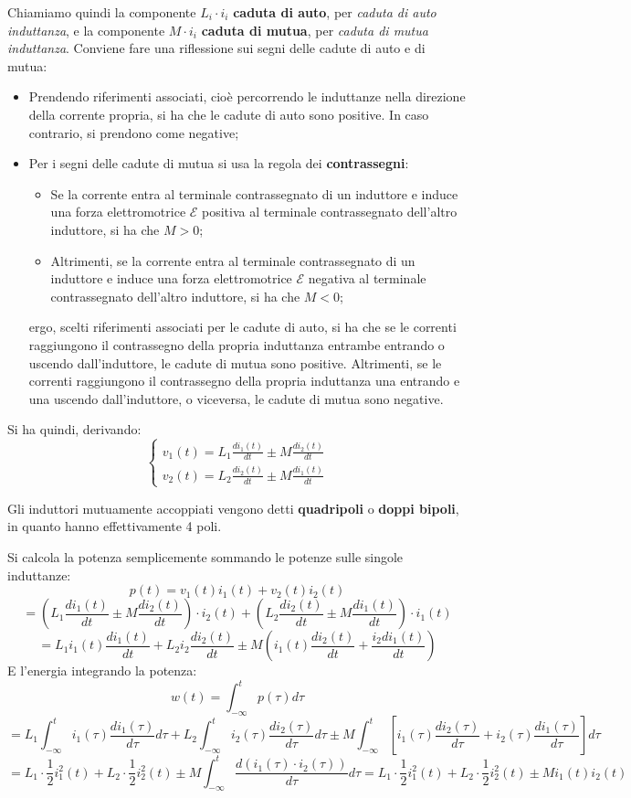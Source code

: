 \documentclass[a4paper,11pt]{article}
\begin{document}
Chiamiamo quindi la componente $L_i \cdot i_i$ \textbf{caduta di auto}, per \textit{caduta di auto induttanza}, e la componente $M \cdot i_i$ \textbf{caduta di mutua}, per \textit{caduta di mutua induttanza}.
Conviene fare una riflessione sui segni delle cadute di auto e di mutua: 
\begin{itemize}
	\item Prendendo riferimenti associati, cioè percorrendo le induttanze nella direzione della corrente propria, si ha che le cadute di auto sono positive. In caso contrario, si prendono come negative;
	\item Per i segni delle cadute di mutua si usa la regola dei \textbf{contrassegni}:
		\begin{itemize}
			\item Se la corrente entra al terminale contrassegnato di un induttore e induce una forza elettromotrice $\mathcal{E}$ positiva al terminale contrassegnato dell'altro induttore, si ha che $M>0$;
			\item Altrimenti, se la corrente entra al terminale contrassegnato di un induttore e induce una forza elettromotrice $\mathcal{E}$ negativa al terminale contrassegnato dell'altro induttore, si ha che $M<0$;
		\end{itemize}
	ergo, scelti riferimenti associati per le cadute di auto, si ha che se le correnti raggiungono il contrassegno della propria induttanza entrambe entrando o uscendo dall'induttore, le cadute di mutua sono positive.
	Altrimenti, se le correnti raggiungono il contrassegno della propria induttanza una entrando e una uscendo dall'induttore, o viceversa, le cadute di mutua sono negative.
\end{itemize}

Si ha quindi, derivando:
\[
	\begin{cases}
		v_1(t) = L_1 \frac{d i_1(t)}{dt} \pm M \frac{d i_2(t)}{dt} \\ 
		v_2(t) = L_2 \frac{d i_2(t)}{dt} \pm M \frac{d i_1(t)}{dt}
	\end{cases}
\]

Gli induttori mutuamente accoppiati vengono detti \textbf{quadripoli} o \textbf{doppi bipoli}, in quanto hanno effettivamente 4 poli.

Si calcola la potenza semplicemente sommando le potenze sulle singole induttanze:
$$
p(t) = v_1(t)i_1(t) + v_2(t)i_2(t)  
$$
$$
= \left( L_1 \frac{d i_1(t)}{dt} \pm M \frac{d i_2 (t)}{dt} \right) \cdot i_2(t) +  \left( L_2 \frac{d i_2(t)}{dt} \pm M \frac{d i_1 (t)}{dt} \right) \cdot i_1(t)
$$
$$
= L_1 i_1(t) \frac{d i_1(t)}{dt} + L_2 i_2 \frac{d i_2(t)}{dt} \pm M \left( i_1(t) \frac{d i_2(t)}{dt} + \frac{i_2 d i_1(t)}{dt} \right)
$$
E l'energia integrando la potenza:
$$
w(t) = \int_{-\infty}^t p(\tau) d\tau 
$$
$$
= L_1 \int_{-\infty}^t i_1(\tau) \frac{d i_1 (\tau)}{d\tau}d\tau + L_2 \int_{-\infty}^t i_2(\tau) \frac{d i_2 (\tau)}{d\tau}d\tau \pm M \int_{-\infty}^t \left[ i_1(\tau) \frac{d i_2(\tau)}{d \tau} + i_2(\tau) \frac{d i_1(\tau)}{d \tau} \right] d\tau
$$
$$
= L_1 \cdot \frac{1}{2} i_1^2(t) + L_2 \cdot \frac{1}{2} i_2^2(t) \pm M \int_{-\infty}^t \frac{d(i_1(\tau) \cdot i_2(\tau))}{d\tau}d\tau = L_1 \cdot \frac{1}{2} i_1^2(t) + L_2 \cdot \frac{1}{2} i_2^2(t) \pm M i_1(t)i_2(t) 
$$
\end{document}
